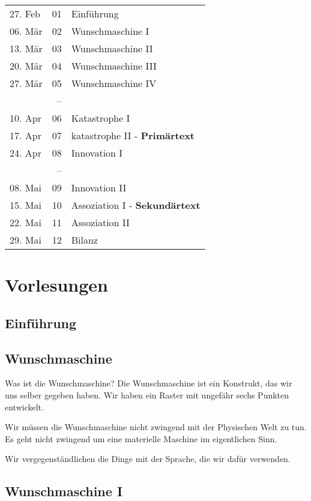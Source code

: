 \documentclass[a4paper,ngerman,11pt]{scrartcl}
\begin{document}
\begin{center}
\begin{tabular}{lrl}
27. Feb & 01 & Einführung\\
06. Mär & 02 & Wunschmaschine I\\
13. Mär & 03 & Wunschmaschine II\\
20. Mär & 04 & Wunschmaschine III\\
27. Mär & 05 & Wunschmaschine IV\\
 & -- & \\
10. Apr & 06 & Katastrophe I\\
17. Apr & 07 & katastrophe II - \textbf{Primärtext}\\
24. Apr & 08 & Innovation I\\
 & -- & \\
08. Mai & 09 & Innovation II\\
15. Mai & 10 & Assoziation I - \textbf{Sekundärtext}\\
22. Mai & 11 & Assoziation II\\
29. Mai & 12 & Bilanz\\
\end{tabular}
\end{center}

\section{Vorlesungen}
\label{sec-2}

\subsection{Einführung}
\label{sec-2-1}

\subsection{Wunschmaschine}
\label{sec-2-2}

Was ist die Wunschmaschine? Die Wunschmaschine ist ein Konstrukt, das wir uns
selber gegeben haben. Wir haben ein Raster mit ungefähr sechs Punkten
entwickelt.

Wir müssen die Wunschmaschine nicht zwingend mit der Physischen Welt zu
tun. Es geht nicht zwingend um eine materielle Maschine im eigentlichen Sinn.

Wir vergegenständlichen die Dinge mit der Sprache, die wir dafür verwenden.

\subsection{Wunschmaschine I}
\label{sec-2-3}
\end{document}
